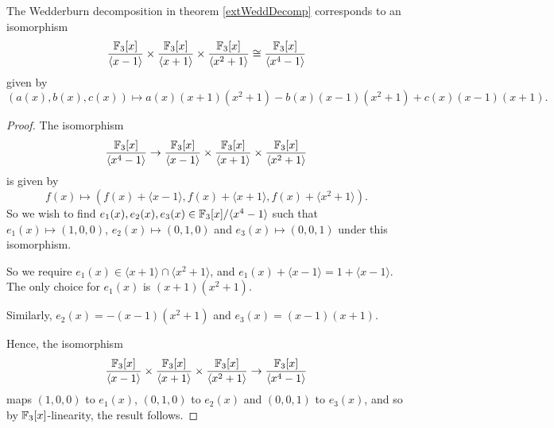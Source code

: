 \documentclass{unswmaths}
\begin{document}
\begin{lemma}
\label{intWeddDecomp}
    The Wedderburn decomposition in theorem \ref{extWeddDecomp} corresponds to
    an isomorphism
    \begin{equation*}
        \frac{{\mathbb{F}_3}[x]}{\langle x-1\rangle}\times\frac{{\mathbb{F}_3}[x]}{\langle x+1\rangle}\times\frac{{\mathbb{F}_3}[x]}{\langle x^2+1\rangle}\cong \frac{{\mathbb{F}_3}[x]}{\langle x^4-1\rangle}
    \end{equation*}
    given by
    \begin{equation*}
        (a(x),b(x),c(x))\mapsto a(x)(x+1)(x^2+1)-b(x)(x-1)(x^2+1)+c(x)(x-1)(x+1).
    \end{equation*}
\end{lemma}
\begin{proof}
    The isomorphism
    \begin{equation*}
        \frac{{\mathbb{F}_3}[x]}{\langle x^4-1\rangle} \rightarrow \frac{{\mathbb{F}_3}[x]}{\langle x-1\rangle}\times\frac{{\mathbb{F}_3}[x]}{\langle x+1\rangle}\times\frac{{\mathbb{F}_3}[x]}{\langle x^2+1\rangle}
    \end{equation*}
    is given by
    \begin{equation*}
        f(x) \mapsto (f(x)+\langle x-1\rangle,f(x)+\langle x+1\rangle,f(x)+\langle x^2+1\rangle).
    \end{equation*}
    So we wish to find $e_1(x),e_2(x),e_3(x) \in {\mathbb{F}_3}[x]/\langle x^4-1\rangle$ such that $e_1(x)\mapsto (1,0,0)$,
    $e_2(x)\mapsto (0,1,0)$ and $e_3(x)\mapsto (0,0,1)$ under this isomorphism.
    
    So we require $e_1(x) \in \langle x+1\rangle\cap\langle x^2+1\rangle$, and 
    $e_1(x) + \langle x-1\rangle = 1+\langle x-1\rangle$. The only choice for $e_1(x)$
    is $(x+1)(x^2+1)$. 
    
    Similarly, $e_2(x) = -(x-1)(x^2+1)$ and $e_3(x) = (x-1)(x+1)$. 
    
    Hence, the isomorphism
    \begin{equation*}
        \frac{{\mathbb{F}_3}[x]}{\langle x-1\rangle}\times\frac{{\mathbb{F}_3}[x]}{\langle x+1\rangle}\times\frac{{\mathbb{F}_3}[x]}{\langle x^2+1\rangle}\rightarrow \frac{{\mathbb{F}_3}[x]}{\langle x^4-1\rangle}
    \end{equation*}
    maps $(1,0,0)$ to $e_1(x)$, $(0,1,0)$ to $e_2(x)$ and $(0,0,1)$ to $e_3(x)$, and 
    so by ${\mathbb{F}_3}[x]$-linearity, the result follows.
\end{proof}
\end{document}
